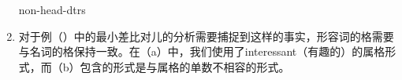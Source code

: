 \begin{enumerate}
{{      non-head-dtrs  \\
}}
\label{avm-max-lacht}
\item 对于例（）中的最小差比对儿的分析需要捕捉到这样的事实，形容词的格需要与名词的格保持一致。在（a）中，我们使用了interessant（有趣的）的属格形式，而（b）包含的形式是与属格的单数不相容的形式。

\end{enumerate}
